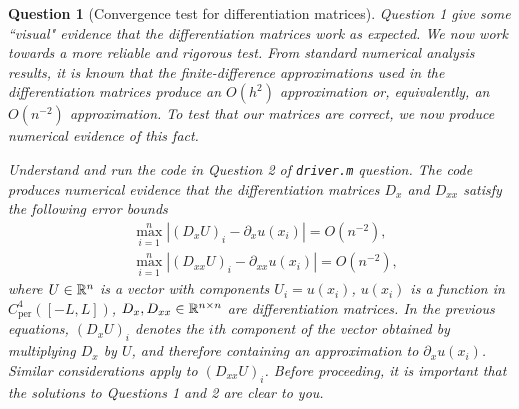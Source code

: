 \documentclass[a4paper]{siamart220329}
\theoremstyle{plain}
\newtheorem{question}{Question}
\begin{document}
\begin{question}[Convergence test for differentiation matrices]
  \label{question:convPer} Question 1 give some ``visual" evidence that
the differentiation matrices work as expected. We now work towards a more reliable and
rigorous test. From standard numerical analysis results, it is known that the
finite-difference approximations used in the differentiation matrices produce an
$O(h^2)$ approximation or, equivalently, an $O(n^{-2})$ approximation. To test that
our matrices are correct, we now produce numerical evidence of this fact.

Understand and run the code in Question 2 of \lstinline|driver.m| question. The code
produces numerical evidence that the differentiation matrices $D_x$ and $D_{xx}$
satisfy the following error bounds
\[
  \begin{aligned}
    & \max_{i=1}^n | (D_x U)_i - \partial_x u(x_i) | = O(n^{-2}), \\
    & \max_{i=1}^n | (D_{x x} U)_i - \partial_{x x} u(x_i) | = O(n^{-2}),
  \end{aligned}
\]
where $U \in \mathbb{R}^n$ is a vector with components $U_i = u(x_i)$, $u(x_i)$ is a
function in $C^4_\textrm{per}([-L,L])$, $D_x, D_{x x} \in \mathbb{R}^{n
\times n}$ are differentiation matrices. In the previous equations, $(D_x U)_i$
denotes the $i$th component of the vector obtained by multiplying $D_x$ by $U$, and
therefore containing an approximation to $\partial_x u(x_i)$. Similar considerations
apply to $(D_{x x} U)_i$. Before proceeding, it is important that the solutions to
Questions 1 and 2 are clear to you.
\end{question}
\end{document}
